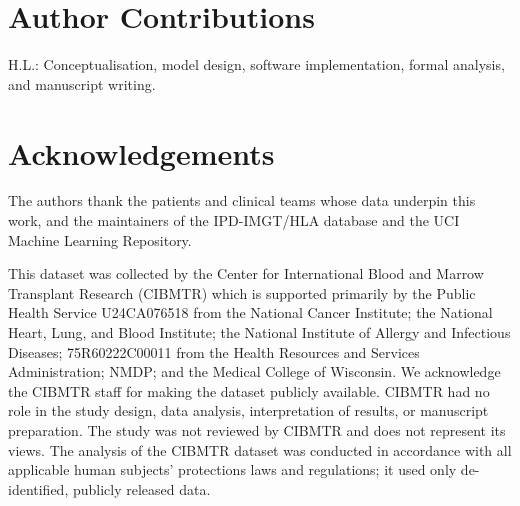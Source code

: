 \documentclass[11pt,a4paper]{article}
\begin{document}
\section*{Author Contributions}
H.L.: Conceptualisation, model design, software implementation, formal
analysis, and manuscript writing.

\section*{Acknowledgements}
The authors thank the patients and clinical teams whose data underpin this
work, and the maintainers of the IPD-IMGT/HLA database and the UCI Machine
Learning Repository.

This dataset was collected by the Center for International Blood and Marrow
Transplant Research (CIBMTR) which is supported primarily by the Public
Health Service U24CA076518 from the National Cancer Institute; the National
Heart, Lung, and Blood Institute; the National Institute of Allergy and
Infectious Diseases; 75R60222C00011 from the Health Resources and Services
Administration; NMDP; and the Medical College of Wisconsin.  We acknowledge
the CIBMTR staff for making the dataset publicly available.  CIBMTR had no
role in the study design, data analysis, interpretation of results, or
manuscript preparation.  The study was not reviewed by CIBMTR and does not
represent its views.  The analysis of the CIBMTR dataset was conducted in
accordance with all applicable human subjects' protections laws and
regulations; it used only de-identified, publicly released data.



\end{document}

